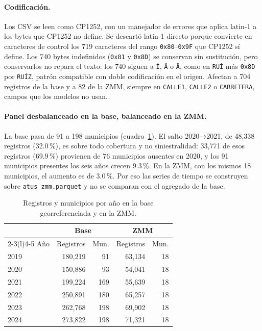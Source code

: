 \paragraph{Codificación.} Los CSV se leen como CP1252, con un manejador de errores
que aplica latin-1 a los bytes que CP1252 no define. Se descartó latin-1 directo
porque convierte en caracteres de control los 719 caracteres del rango
\texttt{0x80}--\texttt{0x9F} que CP1252 sí define. Los 740 bytes indefinidos
(\texttt{0x81} y \texttt{0x8D}) se conservan sin sustitución, pero conservarlos no
repara el texto: los 740 siguen a \texttt{Í}, \texttt{Ã} o \texttt{Â}, como en
\texttt{RUÍ} más \texttt{0x8D} por \texttt{RUÍZ}, patrón compatible con doble
codificación en el origen. Afectan a 704 registros de la base y a 82 de la ZMM,
siempre en \texttt{CALLE1}, \texttt{CALLE2} o \texttt{CARRETERA}, campos que los
modelos no usan.

\paragraph{Panel desbalanceado en la base, balanceado en la ZMM.} La base pasa de
91 a 198 municipios (cuadro~\ref{tab:datos-panel}). El salto 2020→2021, de 48,338
registros (32.0\,\%), es sobre todo cobertura y no siniestralidad: 33,771 de esos
registros (69.9\,\%) provienen de 76 municipios ausentes en 2020, y los 91 municipios
presentes los seis años crecen 9.3\,\%. En la ZMM, con los mismos 18 municipios,
el aumento es de 3.0\,\%. Por eso las series de tiempo se construyen sobre
\texttt{atus\_zmm.parquet} y no se comparan con el agregado de la base.

\begin{table}
	\centering\small
	\caption{Registros y municipios por año en la base georreferenciada y en la
		ZMM.}
	\label{tab:datos-panel}
	\begin{tabular}{@{}lrrrr@{}}
		\toprule
		     & \multicolumn{2}{c}{Base} & \multicolumn{2}{c}{ZMM}                      \\
		\cmidrule(lr){2-3}\cmidrule(l){4-5}
		Año  & Registros                & Mun.                    & Registros & Mun. \\
		\midrule
		2019 & 180,219                  & 91                      & 63,134    & 18   \\
		2020 & 150,886                  & 93                      & 54,041    & 18   \\
		2021 & 199,224                  & 169                     & 55,639    & 18   \\
		2022 & 250,891                  & 180                     & 65,257    & 18   \\
		2023 & 262,768                  & 198                     & 69,902    & 18   \\
		2024 & 273,822                  & 198                     & 71,321    & 18   \\
		\bottomrule
	\end{tabular}
\end{table}

